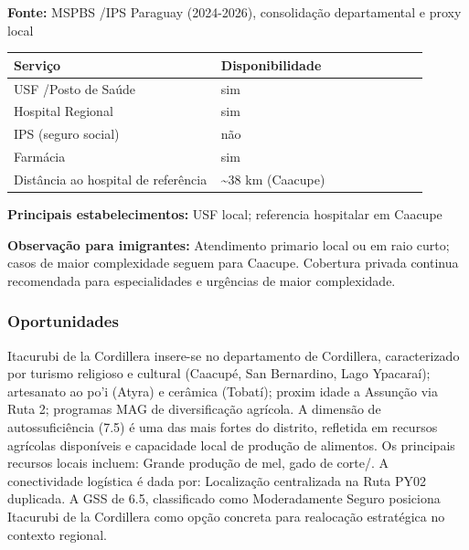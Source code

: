 \textbf{Fonte:} MSPBS /\allowbreak  IPS Paraguay (2024-2026), consolidação
departamental e proxy local

{\def\LTcaptype{none} %
\begin{longtable}{@{}>{\raggedright\arraybackslash}p{0.45\linewidth} >{\raggedright\arraybackslash}p{0.45\linewidth}@{}}
\toprule\noalign{}
Serviço & Disponibilidade \\
\midrule\noalign{}
\endhead
\bottomrule\noalign{}
\endlastfoot
USF /\allowbreak  Posto de Saúde & sim \\
Hospital Regional & sim \\
IPS (seguro social) & não \\
Farmácia & sim \\
Distância ao hospital de referência & \textasciitilde38 km (Caacupe) \\
\end{longtable}
}

\textbf{Principais estabelecimentos:} USF local; referencia hospitalar
em Caacupe

\textbf{Observação para imigrantes:} Atendimento primario local ou em
raio curto; casos de maior complexidade seguem para Caacupe. Cobertura
privada continua recomendada para especialidades e urgências de maior
complexidade.
\newpage

\subsubsection*{Oportunidades}\label{oport-itacurubi-de-la-cordillera-0309}
Itacurubi de la Cordillera insere-se no departamento de Cordillera, caracterizado por turismo religioso e cultural (Caacupé, San Bernardino, Lago Ypacaraí); artesanato ao po'i (Atyra) e cerâmica (Tobatí); proxim idade a Assunção via Ruta 2; programas MAG de diversificação agrícola. A dimensão de autossuficiência (7.5) é uma das mais fortes do distrito, refletida em recursos agrícolas disponíveis e capacidade local de produção de alimentos. Os principais recursos locais incluem: Grande produção de mel, gado de corte/. A conectividade logística é dada por: Localização centralizada na Ruta PY02 duplicada. A GSS de 6.5, classificado como Moderadamente Seguro posiciona Itacurubi de la Cordillera como opção concreta para realocação estratégica no contexto regional.

